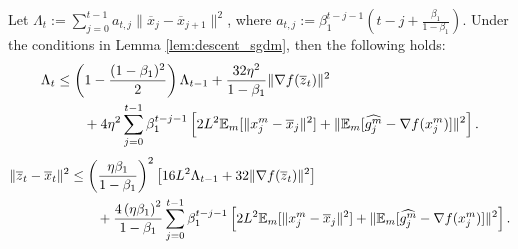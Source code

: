\documentclass{article} %
\numberwithin{equation}{section}
\begin{document}
\begin{lemma}\label{lem:z-x_sgdm}
    Let $\Lambda_t:= \sum_{j=0}^{t-1}a_{t,j}\|\overline{x}_j-\overline{x}_{j+1}\|^2$, where $a_{t,j}:=\beta_1^{t-j-1}(t-j+\frac{\beta_1}{1-\beta_1})$. Under the conditions in Lemma \ref{lem:descent_sgdm}, then the following holds:
    \begin{equation}\label{eq:15}
        \begin{aligned}
            \Lambda_t
            &\leq \left(1-\frac{(1-\beta_1)^2}{2}\right)\Lambda_{t-1} + \frac{32\eta^2}{1-\beta_1}\|\nabla f(\overline{z}_t)\|^2 \\
            &\qquad + 4\eta^2\sum_{j=0}^{t-1}\beta_1^{t-j-1}\left[2L^2\mathbb{E}_m[\|x_j^m-\overline{x}_j\|^2]+\|\mathbb{E}_m[\widehat{g_j^m}-\nabla f(x_j^m)]\|^2 \right]. 
        \end{aligned}
    \end{equation}
    \begin{equation}\label{eq:16}
        \begin{aligned}
            \|\overline{z}_t-\overline{x}_t\|^2
            &\leq \left(\frac{\eta\beta_1}{1-\beta_1}\right)^2 \left[16L^2\Lambda_{t-1} + 32\|\nabla f(\overline{z}_t)\|^2 \right]\\ 
            &\qquad +\frac{4\left(\eta\beta_1\right)^2}{1-\beta_1}\sum_{j=0}^{t-1}\beta_1^{t-j-1}\left[2L^2\mathbb{E}_m[\|x_j^m-\overline{x}_j\|^2]+\|\mathbb{E}_m[\widehat{g_j^m}-\nabla f(x_j^m)]\|^2 \right].
        \end{aligned}
    \end{equation}
\end{lemma}
\end{document}
